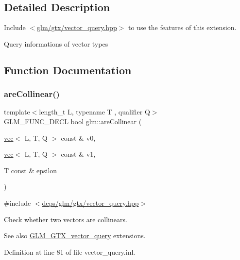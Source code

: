 \subsection{Detailed Description}
Include $<$\hyperlink{vector__query_8hpp}{glm/gtx/vector\+\_\+query.\+hpp}$>$ to use the features of this extension.

Query informations of vector types 

\subsection{Function Documentation}
\mbox{\label{group__gtx__vector__query_ga13da4a787a2ff70e95d561fb19ff91b4}} 
\subsubsection{\texorpdfstring{are\+Collinear()}{areCollinear()}}
{\footnotesize\ttfamily template$<$length\+\_\+t L, typename T , qualifier Q$>$ \\
G\+L\+M\+\_\+\+F\+U\+N\+C\+\_\+\+D\+E\+CL bool glm\+::are\+Collinear (\begin{DoxyParamCaption}\item[{\hyperlink{structglm_1_1vec}{vec}$<$ L, T, Q $>$ const \&}]{v0,  }\item[{\hyperlink{structglm_1_1vec}{vec}$<$ L, T, Q $>$ const \&}]{v1,  }\item[{T const \&}]{epsilon }\end{DoxyParamCaption})}



{\ttfamily \#include $<$\hyperlink{vector__query_8hpp}{deps/glm/gtx/vector\+\_\+query.\+hpp}$>$}

Check whether two vectors are collinears. \begin{DoxySeeAlso}{See also}
\hyperlink{group__gtx__vector__query}{G\+L\+M\+\_\+\+G\+T\+X\+\_\+vector\+\_\+query} extensions. 
\end{DoxySeeAlso}


Definition at line 81 of file vector\+\_\+query.\+inl.

\mbox{\label{group__gtx__vector__query_gac7b95b3f798e3c293262b2bdaad47c57}} 
